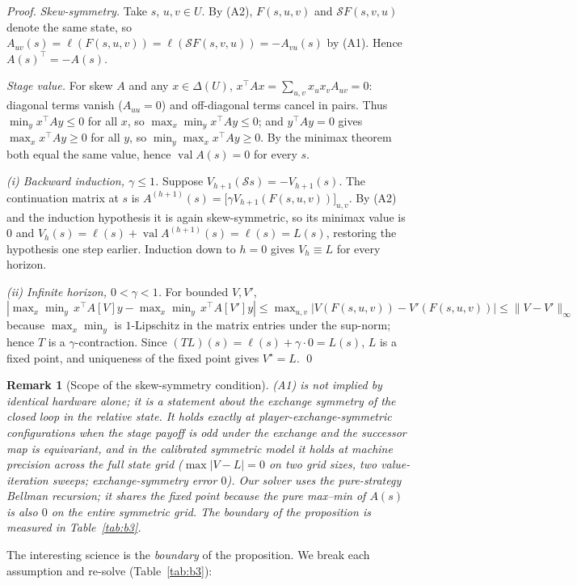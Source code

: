 \documentclass[12pt,a4paper]{article}
\newtheorem{remark}{Remark}
\begin{document}
\begin{proof}
\emph{Skew-symmetry.}  Take $s$, $u,v\in U$.  By (A2),
$F(s,u,v)$ and $\mathcal S F(s,v,u)$ denote the same state, so
$A_{uv}(s)=\ell(F(s,u,v))=\ell(\mathcal S F(s,v,u))=-A_{vu}(s)$ by (A1).
Hence $A(s)^\top=-A(s)$.

\emph{Stage value.}  For skew $A$ and any $x\in\Delta(U)$,
$x^\top A x=\sum_{u,v}x_ux_vA_{uv}=0$: diagonal terms vanish
($A_{uu}=0$) and off-diagonal terms cancel in pairs.  Thus
$\min_y x^\top Ay\le0$ for all $x$, so
$\max_x\min_y x^\top Ay\le0$; and $y^\top Ay=0$ gives
$\max_x x^\top Ay\ge0$ for all $y$, so
$\min_y\max_x x^\top Ay\ge0$.  By the minimax theorem both equal the same
value, hence $\operatorname{val}A(s)=0$ for every $s$.

\emph{(i) Backward induction, $\gamma\le1$.}  Suppose
$V_{h+1}(\mathcal S s)=-V_{h+1}(s)$.  The continuation matrix at $s$ is
$A^{(h+1)}(s)=\bigl[\gamma V_{h+1}(F(s,u,v))\bigr]_{u,v}$.  By (A2) and the
induction hypothesis it is again skew-symmetric, so its minimax value is
$0$ and $V_h(s)=\ell(s)+\operatorname{val}A^{(h+1)}(s)=\ell(s)=L(s)$,
restoring the hypothesis one step earlier.  Induction down to $h=0$ gives
$V_h\equiv L$ for every horizon.

\emph{(ii) Infinite horizon, $0<\gamma<1$.}  For bounded $V,V'$,
$|\max_x\min_y\,x^\top A[V]y-\max_x\min_y\,x^\top A[V']y|
\le\max_{u,v}|V(F(s,u,v))-V'(F(s,u,v))|\le\|V-V'\|_\infty$ because
$\max_x\min_y$ is $1$-Lipschitz in the matrix entries under the sup-norm;
hence $T$ is a $\gamma$-contraction.  Since $(TL)(s)=\ell(s)+\gamma\cdot0
=L(s)$, $L$ is a fixed point, and uniqueness of the fixed point gives
$V^\star=L$.  \qed
\end{proof}

\begin{remark}[Scope of the skew-symmetry condition]\label{rem:skew}
\textup{(A1)} is \emph{not} implied by identical hardware alone; it is a
statement about the exchange symmetry of the closed loop in the relative
state.  It holds exactly at player-exchange-symmetric configurations when
the stage payoff is odd under the exchange and the successor map is
equivariant, and in the calibrated symmetric model it holds at machine
precision across the full state grid ($\max|V-L|=0$ on two grid sizes,
two value-iteration sweeps; exchange-symmetry error $0$).  Our solver uses
the pure-strategy Bellman recursion; it shares the fixed point because the
pure max--min of $A(s)$ is also $0$ on the entire symmetric grid.  The
boundary of the proposition is measured in Table~\ref{tab:b3}.
\end{remark}
The interesting science is the \emph{boundary} of the proposition.  We
break each assumption and re-solve (Table~\ref{tab:b3}):
\end{document}
